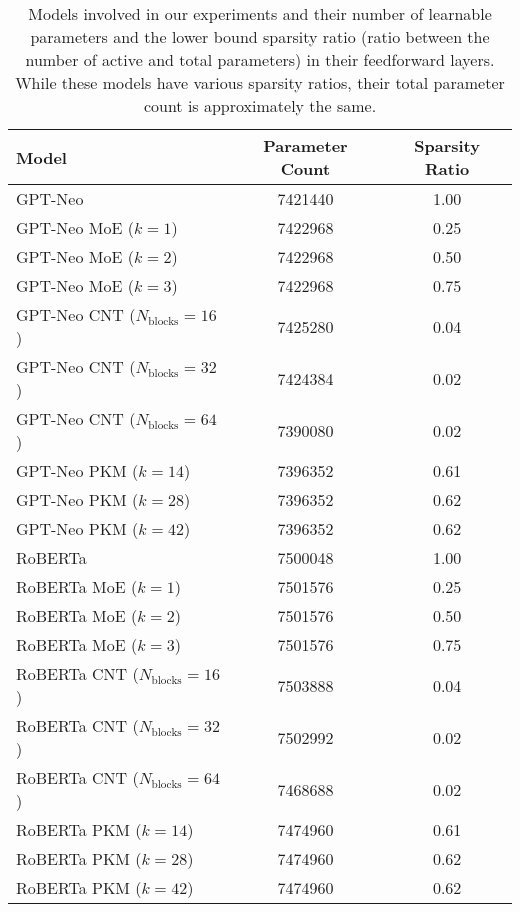 \begin{table}[h]

\centering
\caption{Models involved in our experiments and their number of learnable parameters and the lower bound sparsity ratio (ratio between the number of active and total parameters) in their feedforward layers. While these models have various sparsity ratios, their total parameter count is approximately the same.}
\label{tab:mode-size}
\tiny
\begin{tabular}{lcc}
\toprule
\textbf{Model} & \textbf{Parameter Count} & \textbf{Sparsity Ratio} \\
\midrule
GPT-Neo & 7421440 & 1.00 \\
GPT-Neo MoE ($k=1$) & 7422968 & 0.25 \\
GPT-Neo MoE ($k=2$) & 7422968 & 0.50 \\
GPT-Neo MoE ($k=3$) & 7422968 & 0.75\\
GPT-Neo CNT ($N_\text{blocks}=16$) & 7425280 & 0.04\\
GPT-Neo CNT ($N_\text{blocks}=32$) & 7424384 & 0.02\\
GPT-Neo CNT ($N_\text{blocks}=64$) & 7390080 & 0.02 \\
GPT-Neo PKM ($k=14$) & 7396352 & 0.61 \\
GPT-Neo PKM ($k=28$) & 7396352 & 0.62 \\
GPT-Neo PKM ($k=42$) & 7396352 & 0.62 \\
\midrule
RoBERTa & 7500048 & 1.00 \\
RoBERTa MoE ($k=1$) & 7501576 & 0.25 \\
RoBERTa MoE ($k=2$) & 7501576 & 0.50 \\
RoBERTa MoE ($k=3$) & 7501576 & 0.75 \\
RoBERTa CNT ($N_\text{blocks}=16$) & 7503888 & 0.04\\
RoBERTa CNT ($N_\text{blocks}=32$) & 7502992 & 0.02\\
RoBERTa CNT ($N_\text{blocks}=64$) & 7468688 & 0.02\\
RoBERTa PKM ($k=14$) & 7474960 & 0.61 \\
RoBERTa PKM ($k=28$) & 7474960 & 0.62 \\
RoBERTa PKM ($k=42$) & 7474960 & 0.62 \\
\bottomrule
\end{tabular}
\end{table}

